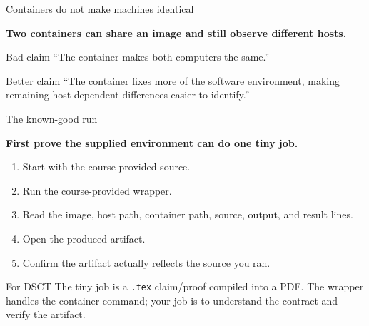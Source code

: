 \documentclass[aspectratio=169,11pt]{beamer}
\newcommand{\bigquestion}[1]{%
  \begin{center}
  \vspace{0.15em}
  {\Large\bfseries\color{DeepNavy}#1}
  \end{center}
}
\begin{document}
\begin{frame}{Containers do not make machines identical}
\bigquestion{Two containers can share an image and still observe different hosts.}

\begin{center}
\end{center}

\begin{alertblock}{Bad claim}
``The container makes both computers the same.''
\end{alertblock}
\begin{exampleblock}{Better claim}
``The container fixes more of the software environment, making remaining host-dependent differences easier to identify.''
\end{exampleblock}
\end{frame}

\begin{frame}{The known-good run}
\bigquestion{First prove the supplied environment can do one tiny job.}

\begin{enumerate}
  \item Start with the course-provided source.
  \item Run the course-provided wrapper.
  \item Read the image, host path, container path, source, output, and result lines.
  \item Open the produced artifact.
  \item Confirm the artifact actually reflects the source you ran.
\end{enumerate}

\begin{block}{For DSCT}
The tiny job is a \texttt{.tex} claim/proof compiled into a PDF. The wrapper handles the container command; your job is to understand the contract and verify the artifact.
\end{block}
\end{frame}
\end{document}
